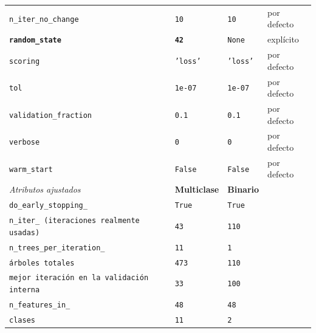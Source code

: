\documentclass[11pt,a4paper]{article}
\begin{document}
{\begin{longtable}{L{3.9cm} L{3.7cm} L{3.0cm} L{2.4cm}}
\texttt{n\_iter\_no\_change} & \texttt{10} & \texttt{10} & por defecto \\
\textbf{\texttt{random\_state}} & \textbf{\texttt{42}} & \texttt{None} & explícito \\
\texttt{scoring} & \texttt{'loss'} & \texttt{'loss'} & por defecto \\
\texttt{tol} & \texttt{1e-07} & \texttt{1e-07} & por defecto \\
\texttt{validation\_fraction} & \texttt{0.1} & \texttt{0.1} & por defecto \\
\texttt{verbose} & \texttt{0} & \texttt{0} & por defecto \\
\texttt{warm\_start} & \texttt{False} & \texttt{False} & por defecto \\
\midrule
\emph{Atributos ajustados} & \textbf{Multiclase} & \textbf{Binario} & \\
\texttt{do\_early\_stopping\_} & \texttt{True} & \texttt{True} & \\
\texttt{n\_iter\_ (iteraciones realmente usadas)} & \texttt{43} & \texttt{110} & \\
\texttt{n\_trees\_per\_iteration\_} & \texttt{11} & \texttt{1} & \\
\texttt{árboles totales} & \texttt{473} & \texttt{110} & \\
\texttt{mejor iteración en la validación interna} & \texttt{33} & \texttt{100} & \\
\texttt{n\_features\_in\_} & \texttt{48} & \texttt{48} & \\
\texttt{clases} & \texttt{11} & \texttt{2} & \\
\end{longtable}

}
\end{document}
